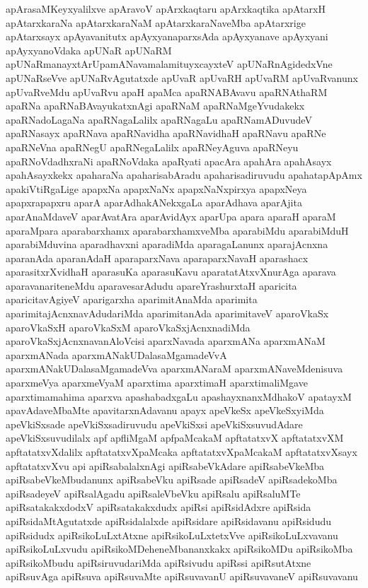 {apArasaMKeyxyalilxve
apAravoV
apArxkaqtaru
apArxkaqtika
apAtarxH
apAtarxkaraNa
apAtarxkaraNaM
apAtarxkaraNaveMba
apAtarxrige
apAtarxsayx
apAyavanitutx
apAyxyanaparxsAda
apAyxyanave
apAyxyani
apAyxyanoVdaka
apUNaR
apUNaRM
apUNaRmanayxtArUpamANavamalamituyxcayxteV
apUNaRnAgidedxVne
apUNaRseVve
apUNaRvAgutatxde
apUvaR
apUvaRH
apUvaRM
apUvaRvanunx
apUvaRveMdu
apUvaRvu
apaH
apaMca
apaRNABAvavu
apaRNAthaRM
apaRNa
apaRNaBAvayukatxnAgi
apaRNaM
apaRNaMgeYvudakekx
apaRNadoLagaNa
apaRNagaLalilx
apaRNagaLu
apaRNamADuvudeV
apaRNasayx
apaRNava
apaRNavidha
apaRNavidhaH
apaRNavu
apaRNe
apaRNeVna
apaRNegU
apaRNegaLalilx
apaRNeyAguva
apaRNeyu
apaRNoVdadhxraNi
apaRNoVdaka
apaRyati
apacAra
apahAra
apahAsayx
apahAsayxkekx
apaharaNa
apaharisabAradu
apaharisadiruvudu
apahatapApAmx
apakiVtiRgaLige
apapxNa
apapxNaNx
apapxNaNxpirxya
apapxNeya
apapxrapapxru
aparA
aparAdhakANekxgaLa
aparAdhava
aparAjita
aparAnaMdaveV
aparAvatAra
aparAvidAyx
aparUpa
apara
aparaH
aparaM
aparaMpara
aparabarxhamx
aparabarxhamxveMba
aparabiMdu
aparabiMduH
aparabiMduvina
aparadhavxni
aparadiMda
aparagaLanunx
aparajAcnxna
aparanAda
aparanAdaH
aparaparxNava
aparaparxNavaH
aparashacx
aparasitxrXvidhaH
aparasuKa
aparasuKavu
aparatatAtxvXnurAga
aparava
aparavanariteneMdu
aparavesarAdudu
apareYrashurxtaH
aparicita
aparicitavAgiyeV
aparigarxha
aparimitAnaMda
aparimita
aparimitajAcnxnavAdudariMda
aparimitanAda
aparimitaveV
aparoVkaSx
aparoVkaSxH
aparoVkaSxM
aparoVkaSxjAcnxnadiMda
aparoVkaSxjAcnxnavanAloVcisi
aparxNavada
aparxmANa
aparxmANaM
aparxmANada
aparxmANakUDalasaMgamadeVvA
aparxmANakUDalasaMgamadeVva
aparxmANaraM
aparxmANaveMdenisuva
aparxmeVya
aparxmeVyaM
aparxtima
aparxtimaH
aparxtimaliMgave
aparxtimamahima
aparxva
apashabadxgaLu
apashayxnanxMdhakoV
apatayxM
apavAdaveMbaMte
apavitarxnAdavanu
apayx
apeVkeSx
apeVkeSxyiMda
apeVkiSxsade
apeVkiSxsadiruvudu
apeVkiSxsi
apeVkiSxsuvudAdare
apeVkiSxsuvudilalx
apf
apfliMgaM
apfpaMcakaM
apftatatxvX
apftatatxvXM
apftatatxvXdalilx
apftatatxvXpaMcaka
apftatatxvXpaMcakaM
apftatatxvXsayx
apftatatxvXvu
api
apiRsabalalxnAgi
apiRsabeVkAdare
apiRsabeVkeMba
apiRsabeVkeMbudanunx
apiRsabeVku
apiRsade
apiRsadeV
apiRsadekoMba
apiRsadeyeV
apiRsalAgadu
apiRsaleVbeVku
apiRsalu
apiRsaluMTe
apiRsatakakxdodxV
apiRsatakakxdudx
apiRsi
apiRsidAdxre
apiRsida
apiRsidaMtAgutatxde
apiRsidalalxde
apiRsidare
apiRsidavanu
apiRsidudu
apiRsidudx
apiRsikoLuLxtAtxne
apiRsikoLuLxtetxVve
apiRsikoLuLxvavanu
apiRsikoLuLxvudu
apiRsikoMDeheneMbananxkakx
apiRsikoMDu
apiRsikoMba
apiRsikoMbudu
apiRsiruvudariMda
apiRsivudu
apiRssi
apiRsutAtxne
apiRsuvAga
apiRsuva
apiRsuvaMte
apiRsuvavanU
apiRsuvavaneV
apiRsuvavanu
}
